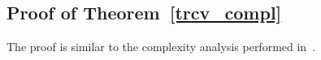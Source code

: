 \documentclass[11pt,a4paper]{amsart}
\theoremstyle{plain}
\theoremstyle{definition}
\theoremstyle{remark}
\numberwithin{equation}{section}
\begin{document}
\subsection{Proof of Theorem~\protect\ref{trcv_compl}}
The proof is similar to the complexity analysis
performed in~\cite{belomestny2016konakov}.




\end{document}
